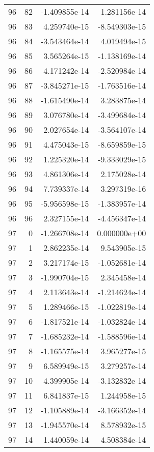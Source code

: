 \begin{tabular}{rrrr}
  96 &   82 & -1.409855e-14 &  1.281156e-14 \\
  96 &   83 &  4.259740e-15 & -8.549303e-15 \\
  96 &   84 & -3.543464e-14 &  4.019494e-15 \\
  96 &   85 &  3.565264e-15 & -1.138169e-14 \\
  96 &   86 &  4.171242e-14 & -2.520984e-14 \\
  96 &   87 & -3.845271e-15 & -1.763516e-14 \\
  96 &   88 & -1.615490e-14 &  3.283875e-14 \\
  96 &   89 &  3.076780e-14 & -3.499684e-14 \\
  96 &   90 &  2.027654e-14 & -3.564107e-14 \\
  96 &   91 &  4.475043e-15 & -8.659859e-15 \\
  96 &   92 &  1.225320e-14 & -9.333029e-15 \\
  96 &   93 &  4.861306e-14 &  2.175028e-14 \\
  96 &   94 &  7.739337e-14 &  3.297319e-16 \\
  96 &   95 & -5.956598e-15 & -1.383957e-14 \\
  96 &   96 &  2.327155e-14 & -4.456347e-14 \\
  97 &    0 & -1.266708e-14 &  0.000000e+00 \\
  97 &    1 &  2.862235e-14 &  9.543905e-15 \\
  97 &    2 &  3.217174e-15 & -1.052681e-14 \\
  97 &    3 & -1.990704e-15 &  2.345458e-14 \\
  97 &    4 &  2.113643e-14 & -1.214624e-14 \\
  97 &    5 &  1.289466e-15 & -1.022819e-14 \\
  97 &    6 & -1.817521e-14 & -1.032824e-14 \\
  97 &    7 & -1.685232e-14 & -1.588596e-14 \\
  97 &    8 & -1.165575e-14 &  3.965277e-15 \\
  97 &    9 &  6.589949e-15 &  3.279257e-14 \\
  97 &   10 &  4.399905e-14 & -3.132832e-14 \\
  97 &   11 &  6.841837e-15 &  1.244958e-15 \\
  97 &   12 & -1.105889e-14 & -3.166352e-14 \\
  97 &   13 & -1.945570e-14 &  8.578932e-15 \\
  97 &   14 &  1.440059e-14 &  4.508384e-14 \\

\end{tabular}
